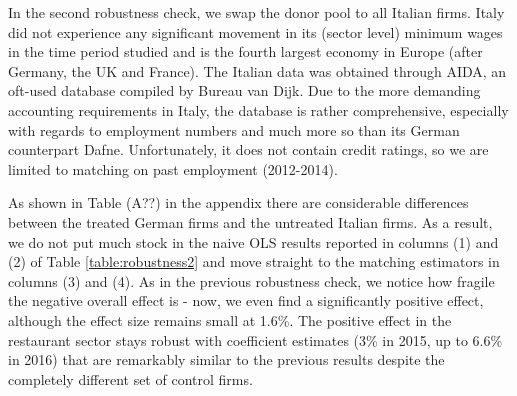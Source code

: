 In the second robustness check, we swap the donor pool to all Italian firms. Italy did not experience any significant movement in its (sector level) minimum wages in the time period studied and is the fourth largest economy in Europe (after Germany, the UK and France). The Italian data was obtained through AIDA, an oft-used database compiled by Bureau van Dijk. Due to the more demanding accounting requirements in Italy, the database is rather comprehensive, especially with regards to employment numbers and much more so than its German counterpart Dafne. Unfortunately, it does not contain credit ratings, so we are limited to matching on past employment (2012-2014).

As shown in Table (A??) in the appendix there are considerable differences between the treated German firms and the untreated Italian firms. As a result, we do not put much stock in the naive OLS results reported in columns (1) and (2) of Table \ref{table:robustness2} and move straight to the matching estimators in columns (3) and (4). As in the previous robustness check, we notice how fragile the negative overall effect is - now, we even find a significantly positive effect, although the effect size remains small at 1.6\%. The positive effect in the restaurant sector stays robust with coefficient estimates (3\% in 2015, up to 6.6\% in 2016) that are remarkably similar to the previous results despite the completely different set of control firms.
